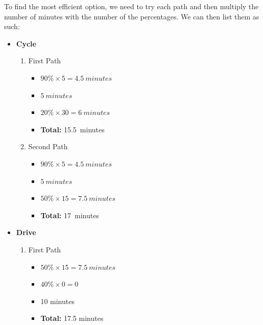 \documentclass[12pt,titlepage]{article}
\begin{document}
\begin{enumerate}
{        To find the most efficient option, we need to try each path and then multiply the number of minutes with the number of the percentages.
        We can then list them as such:
        \begin{itemize}
            \item {
                \textbf{Cycle}
                \begin{enumerate}
                    \item {
                        First Path
                        \begin{itemize}
                            \item $90\% \times 5 = 4.5~minutes$
                            \item $5~minutes$
                            \item $20\% \times 30 = 6~minutes$
                            \item \textbf{Total:} 15.5~minutes
                        \end{itemize}
                    }
                    \item {
                        Second Path
                        \begin{itemize}
                            \item $90\% \times 5 = 4.5~minutes$
                            \item $5~minutes$
                            \item $50\% \times 15 = 7.5~minutes$
                            \item \textbf{Total:} 17~minutes
                        \end{itemize}
                    }
                \end{enumerate}
            }
            \item {
                \textbf{Drive}
                \begin{enumerate}
                    \item {
                        First Path
                        \begin{itemize}
                            \item $50\% \times 15 = 7.5~minutes$
                            \item $40\% \times 0 = 0$
                            \item 10 minutes
                            \item \textbf{Total:} 17.5 minutes
                        \end{itemize}
}
\end{enumerate}}
\end{itemize}}
\end{enumerate}
\end{document}
